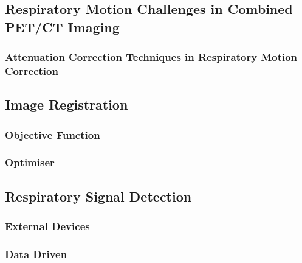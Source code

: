         \subsection{Respiratory Motion Challenges in Combined PET/CT Imaging} \label{respiratory_motion_challenges_in_combined_pet_ct_imaging}
            \blindtext
            
            \subsubsection{Attenuation Correction Techniques in Respiratory Motion Correction} \label{attenuation_correction_techniques_in_respiratory_motion_correction}
                \blindtext
    
        \blindtext
    
        \subsection{Image Registration} \label{image_registration}
            \blindtext
            
            \subsubsection{Objective Function} \label{image_registration_objective_function}
                \blindtext
                
            \subsubsection{Optimiser} \label{image_registration_optimiser}
                \blindtext
            
        \subsection{Respiratory Signal Detection} \label{respiratory_signal_detection}
            \blindtext
            
            \subsubsection{External Devices} \label{external_devices}
                \blindtext
                
            \subsubsection{Data Driven} \label{data_driven}
                \blindtext
                
